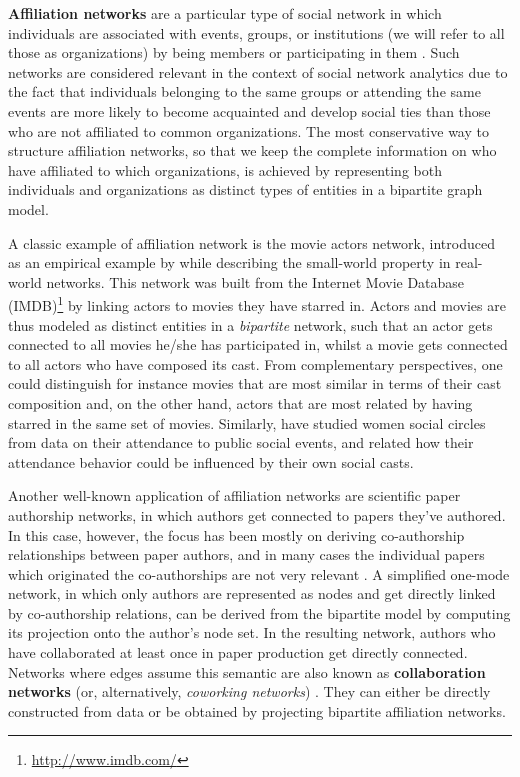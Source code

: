 \textbf{Affiliation networks} are a particular type of social network in which individuals are associated with events, groups, or institutions (we will refer to all those as organizations) by being members or participating in them \cite{Borgatti2015}. 
%
Such networks are considered relevant in the context of social network analytics due to the fact that individuals belonging to the same groups or attending the same events are more likely to become acquainted and develop social ties than those who are not affiliated to common organizations.
%
The most conservative way to structure affiliation networks, so that we keep the complete information on who have affiliated to which organizations, is achieved by representing both individuals and organizations as distinct types of entities in a bipartite graph model.
 
A classic example of affiliation network is the movie actors network, introduced as an empirical example by  while describing the small-world property in real-world networks.
This network was built from the Internet Movie Database (IMDB)\footnote{\url{http://www.imdb.com/}} by linking actors to movies they have starred in.
Actors and movies are thus modeled as distinct entities in a \emph{bipartite} network, such that an actor gets connected to all movies he/she has participated in, whilst a movie gets connected to all actors who have composed its cast.  
From complementary perspectives, one could distinguish for instance movies that are most similar in terms of their cast composition and, on the other hand, actors that are most related by having starred in the same set of movies.
%
Similarly,  have studied women social circles from data on their attendance to public social events, and related how their attendance behavior could be influenced by their own social casts. 

Another well-known application of affiliation networks are scientific paper authorship networks, in which authors get connected to papers they've authored.
In this case, however, the focus has been mostly on deriving co-authorship relationships between paper authors, and in many cases the individual papers which originated the co-authorships are not very relevant \cite{Newman2004, Borrett2014}.
A simplified one-mode network, in which only authors are represented as nodes and get directly linked by co-authorship relations, can be derived from the bipartite model by computing its projection onto the author's node set.
In the resulting network, authors who have collaborated at least once in paper production get directly connected.
Networks where edges assume this semantic are also known as \textbf{collaboration networks} (or, alternatively, \textit{coworking networks}) \cite{Ramasco2004}.
They can either be directly constructed from data or be obtained by projecting bipartite affiliation networks.

